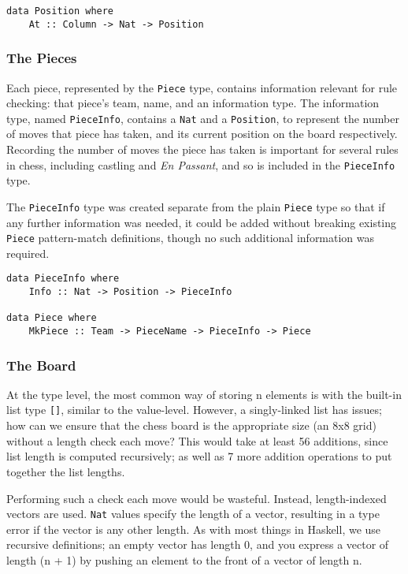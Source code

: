 \documentclass[12pt, a4paper, bibliography=totocnumbered]{scrartcl}
\begin{document}
\begin{lstlisting}
data Position where
    At :: Column -> Nat -> Position
\end{lstlisting}

\subsubsection{The Pieces}

Each piece, represented by the \lstinline[basicstyle=\ttfamily]{Piece} type, contains information relevant for rule checking: that piece's team, name, and an information type. The information type, named \lstinline[basicstyle=\ttfamily]{PieceInfo}, contains a \lstinline[basicstyle=\ttfamily]{Nat} and a \lstinline[basicstyle=\ttfamily]{Position}, to represent the number of moves that piece has taken, and its current position on the board respectively. Recording the number of moves the piece has taken is important for several rules in chess, including castling and \textit{En Passant}, and so is included in the \lstinline[basicstyle=\ttfamily]{PieceInfo} type.

The \lstinline[basicstyle=\ttfamily]{PieceInfo} type was created separate from the plain \lstinline[basicstyle=\ttfamily]{Piece} type so that if any further information was needed, it could be added without breaking existing \lstinline[basicstyle=\ttfamily]{Piece} pattern-match definitions, though no such additional information was required.

\begin{lstlisting}
data PieceInfo where
    Info :: Nat -> Position -> PieceInfo

data Piece where
    MkPiece :: Team -> PieceName -> PieceInfo -> Piece
\end{lstlisting}

\subsubsection{The Board}

At the type level, the most common way of storing n elements is with the built-in list type \lstinline[basicstyle=\ttfamily]{[]}, similar to the value-level. However, a singly-linked list has issues; how can we ensure that the chess board is the appropriate size (an 8x8 grid) without a length check each move? This would take at least 56 additions, since list length is computed recursively; as well as 7 more addition operations to put together the list lengths.

Performing such a check each move would be wasteful. Instead, length-indexed vectors are used. \lstinline[basicstyle=\ttfamily]{Nat} values specify the length of a vector, resulting in a type error if the vector is any other length. As with most things in Haskell, we use recursive definitions; an empty vector has length 0, and you express a vector of length (n + 1) by pushing an element to the front of a vector of length n.
\end{document}
